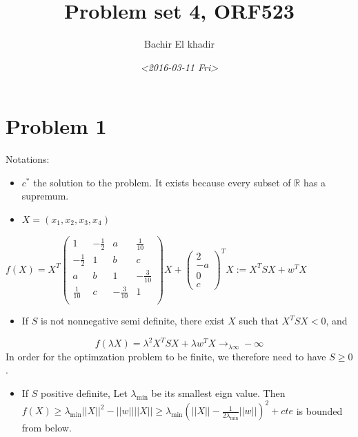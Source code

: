 \documentclass[11pt]{article}
\author{Bachir El khadir}
\date{\textit{<2016-03-11 Fri>}}
\title{Problem set 4, ORF523}
\begin{document}
\maketitle
\begin{HTML}

\label{orgspecialblock1}

\end{HTML}

\section{Problem 1}
\label{sec:orgheadline1}

Notations:
\begin{itemize}
\item \(c^*\) the solution to the problem. It exists because every subset of \(\mathbb R\) has a supremum.
\item \(X = (x_1, x_2, x_3, x_4)\)
\end{itemize}

\(f(X) =
X^T\begin{pmatrix}
 1          & -\frac12 & a           & \frac1{10}  \\
 -\frac12   & 1        & b           & c           \\
 a          & b        & 1           & -\frac3{10} \\
 \frac1{10} & c        & -\frac3{10} & 1           \\
\end{pmatrix}
X+\begin{pmatrix}2\\-a\\0\\c\end{pmatrix}^TX
:= X^TSX + w^TX\)


\begin{itemize}
\item If \(S\) is not nonnegative semi definite, there exist \(X\) such that \(X^TSX < 0\), and
\end{itemize}
$$f(\lambda X) = \lambda^2 X^TSX + \lambda w^TX \rightarrow_{\lambda \infty} -\infty$$
In order for the optimzation problem to be finite, we therefore need to have \(S \ge 0\).
\begin{itemize}
\item If \(S\) positive definite, Let \(\lambda_{\min}\) be its smallest eign value. Then
\(f(X) \ge \lambda_{\min}  ||X||^2 - ||w|| ||X|| \ge \lambda_{\min} (||X|| - \frac1{2\lambda_{\min}}||w||)^2 + cte\) is bounded from below.
\end{itemize}
\end{document}
